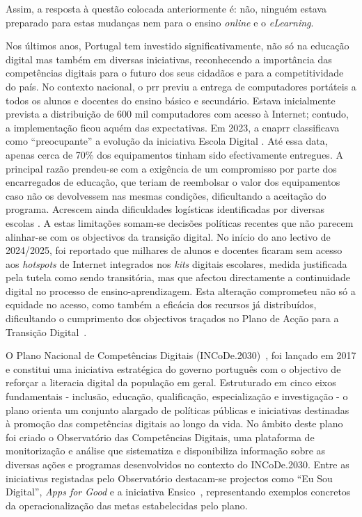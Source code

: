 Assim, a resposta à questão colocada anteriormente é: não, ninguém estava preparado para estas mudanças nem para o ensino \textit{online} e o \textit{eLearning}.

Nos últimos anos, Portugal tem investido significativamente, não só na educação digital mas também em diversas iniciativas, reconhecendo a importância das competências digitais para o futuro dos seus cidadãos e para a competitividade do país. No contexto nacional, o \acrfull{prr} previu a entrega de computadores portáteis a todos os alunos e docentes do ensino básico e secundário. Estava inicialmente prevista a distribuição de 600 mil computadores com acesso à Internet; contudo, a implementação ficou aquém das expectativas. Em 2023, a \acrfull{cnaprr} classificava como ``preocupante'' a evolução da iniciativa Escola Digital \cite{PRREntregacomputadores}. Até essa data, apenas cerca de 70\% dos equipamentos tinham sido efectivamente entregues. A principal razão prendeu-se com a exigência de um compromisso por parte dos encarregados de educação, que teriam de reembolsar o valor dos equipamentos caso não os devolvessem nas mesmas condições, dificultando a aceitação do programa. Acrescem ainda dificuldades logísticas identificadas por diversas escolas \cite{PRREntregacomputadores}. A estas limitações somam-se decisões políticas recentes que não parecem alinhar-se com os objectivos da transição digital. No início do ano lectivo de 2024/2025, foi reportado que milhares de alunos e docentes ficaram sem acesso aos \textit{hotspots} de Internet integrados nos \textit{kits} digitais escolares, medida justificada pela tutela como sendo transitória, mas que afectou directamente a continuidade digital no processo de ensino-aprendizagem. Esta alteração comprometeu não só a equidade no acesso, como também a eficácia dos recursos já distribuídos, dificultando o cumprimento dos objectivos traçados no Plano de Acção para a Transição Digital~\cite{ExecutiveDigest2024}.

O Plano Nacional de Competências Digitais (INCoDe.2030)~\cite{incode2030}, foi lançado em 2017 e constitui uma iniciativa estratégica do governo português com o objectivo de reforçar a literacia digital da população em geral. Estruturado em cinco eixos fundamentais - inclusão, educação, qualificação, especialização e investigação - o plano orienta um conjunto alargado de políticas públicas e iniciativas destinadas à promoção das competências digitais ao longo da vida. No âmbito deste plano foi criado o Observatório das Competências Digitais, uma plataforma de monitorização e análise que sistematiza e disponibiliza informação sobre as diversas ações e programas desenvolvidos no contexto do INCoDe.2030. Entre as iniciativas registadas pelo Observatório destacam-se projectos como ``Eu Sou Digital'', \textit{Apps for Good} e a iniciativa Ensico~\cite{observatorio2030}, representando exemplos concretos da operacionalização das metas estabelecidas pelo plano.

